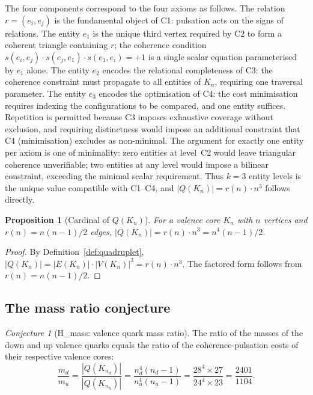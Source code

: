 \documentclass[12pt,a4paper]{article}
\def\QQ{Q}
\theoremstyle{plain}
\newtheorem{proposition}[theorem]{Proposition}
\theoremstyle{definition}
\theoremstyle{remark}
\newtheorem{conjecture}[theorem]{Conjecture}
\newcommand{\nnu}{n_u}
\newcommand{\nnd}{n_d}
\newcommand{\mup}{m_u}
\newcommand{\mdown}{m_d}
\newcommand{\QQ}{\mathcal{Q}}
\begin{document}
The four components correspond to the four axioms as follows. The relation $r = (e_i, e_j)$ is the fundamental object of C1: pulsation acts on the signs of relations. The entity $e_1$ is the unique third vertex required by C2 to form a coherent triangle containing $r$; the coherence condition $s(e_i, e_j) \cdot s(e_j, e_1) \cdot s(e_1, e_i) = +1$ is a single scalar equation parameterised by $e_1$ alone. The entity $e_2$ encodes the relational completeness of C3: the coherence constraint must propagate to all entities of $K_n$, requiring one traversal parameter. The entity $e_3$ encodes the optimisation of C4: the cost minimisation requires indexing the configurations to be compared, and one entity suffices. Repetition is permitted because C3 imposes exhaustive coverage without exclusion, and requiring distinctness would impose an additional constraint that C4 (minimisation) excludes as non-minimal. The argument for exactly one entity per axiom is one of minimality: zero entities at level~C2 would leave triangular coherence unverifiable; two entities at any level would impose a bilinear constraint, exceeding the minimal scalar requirement. Thus $k = 3$ entity levels is the unique value compatible with C1--C4, and $|\QQ(K_n)| = r(n) \cdot n^3$ follows directly.

\begin{proposition}[Cardinal of \texorpdfstring{$\QQ(K_n)$}{Q(Kn)}]\label{prop:cardinal}
For a valence core $K_n$ with $n$ vertices and $r(n) = n(n-1)/2$ edges, $|\QQ(K_n)| = r(n) \cdot n^3 = n^4(n-1)/2$.
\end{proposition}

\begin{proof}
By Definition~\ref{def:quadruplet}, $|\QQ(K_n)| = |E(K_n)| \cdot |V(K_n)|^3 = r(n) \cdot n^3$. The factored form follows from $r(n) = n(n-1)/2$.
\end{proof}

\subsection{The mass ratio conjecture}
\label{subsec:ratio}

\begin{conjecture}[\texorpdfstring{H\_mass: valence quark mass ratio}{H-mass: valence quark mass ratio}]\label{conj:Hmass}
The ratio of the masses of the down and up valence quarks equals the ratio of the coherence-pulsation costs of their respective valence cores:
\[
\frac{\mdown}{\mup} = \frac{|\QQ(K_{\nnd})|}{|\QQ(K_{\nnu})|} = \frac{\nnd^4(\nnd - 1)}{\nnu^4(\nnu - 1)} = \frac{28^4 \times 27}{24^4 \times 23} = \frac{2401}{1104}.
\]
\end{conjecture}
\end{document}

